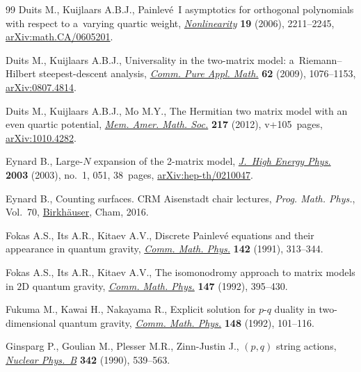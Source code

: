 \documentclass[10pt,a4paper]{amsart}
\numberwithin{equation}{section}
\begin{document}
\begin{thebibliography}{99}
Duits M., Kuijlaars A.B.J., Painlev\'e~{I} asymptotics for orthogonal
 polynomials with respect to a~varying quartic weight,
 \href{https://doi.org/10.1088/0951-7715/19/10/001}{\textit{Nonlinearity}}
 \textbf{19} (2006), 2211--2245,
 \href{http://arxiv.org/abs/math.CA/0605201}{arXiv:math.CA/0605201}.

Duits M., Kuijlaars A.B.J., Universality in the two-matrix model:
 a~{R}iemann--{H}ilbert steepest-descent analysis,
 \href{https://doi.org/10.1002/cpa.20269}{\textit{Comm. Pure Appl. Math.}}
 \textbf{62} (2009), 1076--1153,
 \href{http://arxiv.org/abs/0807.4814}{arXiv:0807.4814}.

Duits M., Kuijlaars A.B.J., Mo M.Y., The {H}ermitian two matrix model with an
 even quartic potential,
 \href{https://doi.org/10.1090/S0065-9266-2011-00639-8}{\textit{Mem. Amer.
 Math. Soc.}} \textbf{217} (2012), v+105~pages,
 \href{http://arxiv.org/abs/1010.4282}{arXiv:1010.4282}.

Eynard B., Large-{$N$} expansion of the 2-matrix model,
 \href{https://doi.org/10.1088/1126-6708/2003/01/051}{\textit{J.~High Energy
 Phys.}} \textbf{2003} (2003), no.~1, 051, 38~pages,
 \href{http://arxiv.org/abs/hep-th/0210047}{arXiv:hep-th/0210047}.

Eynard B., Counting surfaces. CRM Aisenstadt chair lectures, \textit{Prog.
 Math. Phys.}, Vol.~70,
 \href{https://doi.org/10.1007/978-3-7643-8797-6}{Birkh\"auser}, Cham, 2016.

Fokas A.S., Its A.R., Kitaev A.V., Discrete {P}ainlev\'e equations and their
 appearance in quantum gravity,
 \href{https://doi.org/10.1007/BF02102066}{\textit{Comm. Math. Phys.}}
 \textbf{142} (1991), 313--344.

Fokas A.S., Its A.R., Kitaev A.V., The isomonodromy approach to matrix models
 in {$2$}{D} quantum gravity,
 \href{https://doi.org/10.1007/BF02096594}{\textit{Comm. Math. Phys.}}
 \textbf{147} (1992), 395--430.

Fukuma M., Kawai H., Nakayama R., Explicit solution for {$p$}-{$q$} duality in
 two-dimensional quantum gravity,
 \href{https://doi.org/10.1007/BF02102366}{\textit{Comm. Math. Phys.}}
 \textbf{148} (1992), 101--116.

Ginsparg P., Goulian M., Plesser M.R., Zinn-Justin J., {$(p,q)$} string
 actions, \href{https://doi.org/10.1016/0550-3213(90)90326-9}{\textit{Nuclear
 Phys.~B}} \textbf{342} (1990), 539--563.


\end{thebibliography}
\end{document}
